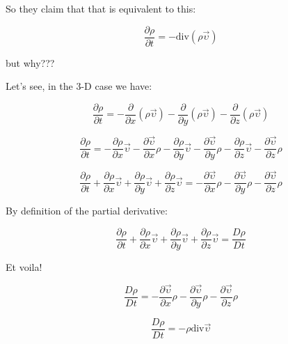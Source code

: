 \documentclass[12pt]{report}
\begin{document}
So they claim that that is equivalent to this:

\begin{equation}
\frac{\partial \rho}{\partial t} = - \text{div} (\rho \vec{\upsilon})
\end{equation}

but why???

Let's see, in the 3-D case we have:

\begin{equation}
\frac{\partial \rho}{\partial t} = - \frac{\partial}{\partial x} (\rho \vec{\upsilon}) - \frac{\partial}{\partial y} (\rho \vec{\upsilon}) - \frac{\partial}{\partial z} (\rho \vec{\upsilon})
\end{equation}

\begin{equation}
\frac{\partial \rho}{\partial t} = - \frac{\partial \rho}{\partial x} \vec{\upsilon} - \frac{\partial \vec{\upsilon}}{\partial x} \rho - \frac{\partial \rho}{\partial y} \vec{\upsilon} - \frac{\partial \vec{\upsilon}}{\partial y} \rho - \frac{\partial \rho}{\partial z} \vec{\upsilon} - \frac{\partial \vec{\upsilon}}{\partial z} \rho 
\end{equation}

\begin{equation}
\frac{\partial \rho}{\partial t} + \frac{\partial \rho}{\partial x} \vec{\upsilon} + \frac{\partial \rho}{\partial y} \vec{\upsilon} + \frac{\partial \rho}{\partial z} \vec{\upsilon} =  - \frac{\partial \vec{\upsilon}}{\partial x} \rho - \frac{\partial \vec{\upsilon}}{\partial y} \rho - \frac{\partial \vec{\upsilon}}{\partial z} \rho
\end{equation}

By definition of the partial derivative:

\begin{equation}
\frac{\partial \rho}{\partial t} + \frac{\partial \rho}{\partial x} \vec{\upsilon} + \frac{\partial \rho}{\partial y} \vec{\upsilon} + \frac{\partial \rho}{\partial z} \vec{\upsilon} = \frac{D \rho}{D t}
\end{equation}

Et voila!

\begin{equation}
\frac{D \rho}{D t} = - \frac{\partial \vec{\upsilon}}{\partial x} \rho - \frac{\partial \vec{\upsilon}}{\partial y} \rho - \frac{\partial \vec{\upsilon}}{\partial z} \rho
\end{equation}


\begin{equation}
\frac{D \rho}{D t} = - \rho \text{div} \vec{\upsilon}
\end{equation}
\end{document}
